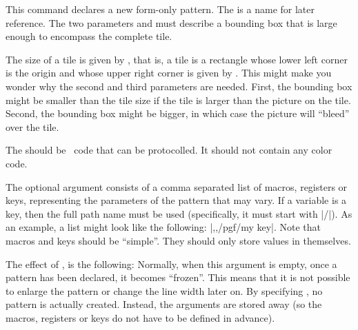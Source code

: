 \begin{command}{\pgfdeclarepatternformonly%
}
    This command declares a new form-only pattern. The  is a name
    for later reference. The two parameters  and  must describe a bounding box that is large enough to encompass the
    complete tile.

    The size of a tile is given by , that is, a tile is a
    rectangle whose lower left   corner is the origin and whose upper right
    corner is given by . This might make you wonder why the
    second and third parameters are needed. First, the bounding box might be
    smaller than the tile size if the tile is larger than the picture on the
    tile. Second, the bounding box might be bigger, in which case the picture
    will ``bleed'' over the tile.

    The  should be \pgfname\ code that can be protocolled. It should
    not contain any color code.
\begin{codeexample}[preamble={\usetikzlibrary{patterns}}]
{\pgfpointorigin}{\pgfpoint{1cm}{1cm}}
{\pgfpoint{1cm}{1cm}}
{
  \pgftransformshift{\pgfpoint{.5cm}{.5cm}}
  \pgfpathclose%
}
\end{codeexample}

    The optional argument  consists of a comma separated list
    of macros, registers or keys, representing the parameters of the pattern
    that may vary. If a variable is a key, then the full path name must be used
    (specifically, it must start with |/|). As an example, a list might look
    like the following: |\mymacro,\mydimen,/pgf/my key|. Note that macros and
    keys should be ``simple''. They should only store values in themselves.

    The effect of , is the following: Normally, when this
    argument is empty, once a pattern has been declared, it becomes ``frozen''.
    This means that it is not possible to enlarge the pattern or change the
    line width later on. By specifying , no pattern is actually
    created. Instead, the arguments are stored away (so the macros, registers
    or keys do not have to be defined in advance).


\end{command}
